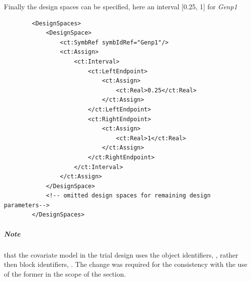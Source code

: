 Finally the design spaces can be specified, here an interval [0.25, 1] for \emph{Genp1}
\lstset{language=XML}
\begin{lstlisting}
        <DesignSpaces>
            <DesignSpace>
                <ct:SymbRef symbIdRef="Genp1"/>
                <ct:Assign>
                    <ct:Interval>
                        <ct:LeftEndpoint>
                            <ct:Assign>
                                <ct:Real>0.25</ct:Real>
                            </ct:Assign>
                        </ct:LeftEndpoint>
                        <ct:RightEndpoint>
                            <ct:Assign>
                                <ct:Real>1</ct:Real>
                            </ct:Assign>
                        </ct:RightEndpoint>
                    </ct:Interval>
                </ct:Assign>
            </DesignSpace>
            <!-- omitted design spaces for remaining design parameters-->
        </DesignSpaces>
\end{lstlisting}

\subparagraph{Note} that the covariate model in the trial design uses 
the object identifiers, , rather then block identifiers, .
The change was required for the consistency with the use of the former 
in the scope of the  section.

